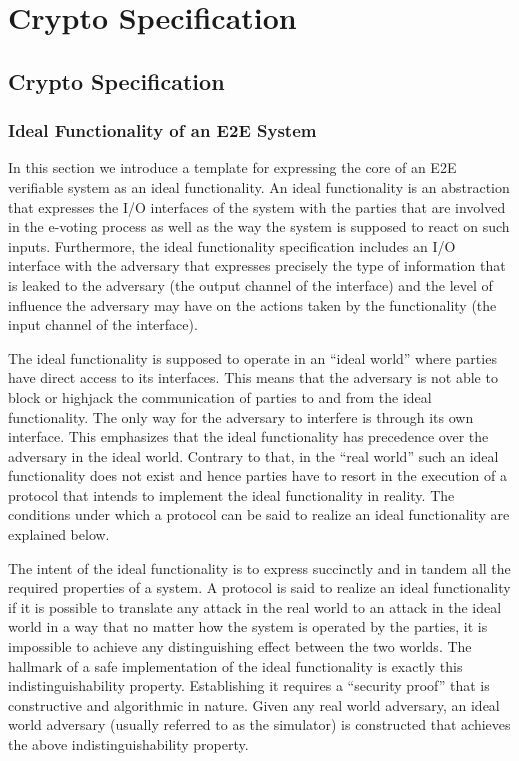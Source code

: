 \chapter{Crypto Specification}
\label{chapter:crypto_spec}


\section{Crypto Specification}


\subsection{Ideal Functionality of an E2E System}

In this section we introduce a template for expressing the core of an
E2E verifiable system as an ideal functionality. An ideal
functionality is an abstraction that expresses the I/O interfaces of
the system with the parties that are involved in the e-voting process
as well as the way the system is supposed to react on such
inputs. Furthermore, the ideal functionality specification includes an
I/O interface with the adversary that expresses precisely the type of
information that is leaked to the adversary (the output channel of the
interface) and the level of influence the adversary may have on the
actions taken by the functionality (the input channel of the
interface).

The ideal functionality is supposed to operate in an ``ideal world''
where parties have direct access to its interfaces. This means that
the adversary is not able to block or highjack the communication of
parties to and from the ideal functionality. The only way for the
adversary to interfere is through its own interface. This emphasizes
that the ideal functionality has precedence over the adversary in the
ideal world. Contrary to that, in the “real world” such an ideal
functionality does not exist and hence parties have to resort in the
execution of a protocol that intends to implement the ideal
functionality in reality. The conditions under which a protocol can be
said to realize an ideal functionality are explained below.

The intent of the ideal functionality is to express succinctly and in
tandem all the required properties of a system. A protocol is said to
realize an ideal functionality if it is possible to translate any
attack in the real world to an attack in the ideal world in a way that
no matter how the system is operated by the parties, it is impossible
to achieve any distinguishing effect between the two worlds. The
hallmark of a safe implementation of the ideal functionality is
exactly this indistinguishability property. Establishing it requires a
“security proof” that is constructive and algorithmic in nature. Given
any real world adversary, an ideal world adversary (usually referred
to as the simulator) is constructed that achieves the above
indistinguishability property.

